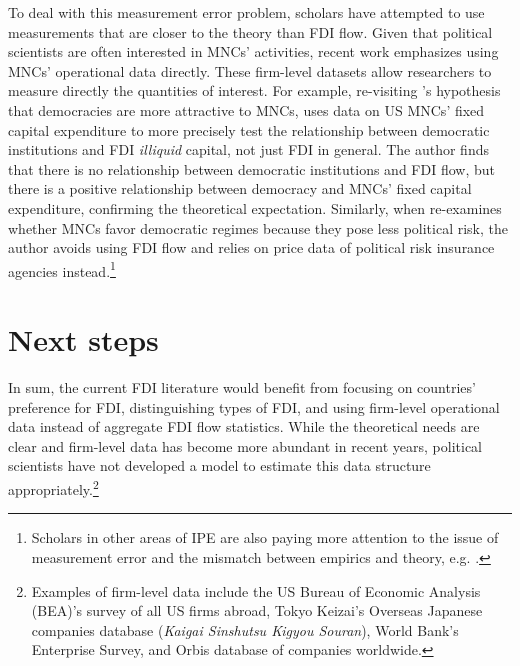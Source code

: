 To deal with this measurement error problem, scholars have attempted to use
measurements that are closer to the theory than FDI flow. Given that political
scientists are often interested in MNCs' activities, recent work emphasizes
using MNCs' operational data directly. These firm-level datasets allow
researchers to measure directly the quantities of interest. For example,
re-visiting \citet{Li2009a}'s hypothesis that democracies are more attractive to
MNCs, \citet{Kerner2014} uses data on US MNCs' fixed capital expenditure to more
precisely test the relationship between democratic institutions and FDI
\textit{illiquid} capital, not just FDI in general. The author finds that there
is no relationship between democratic institutions and FDI flow, but there is a
positive relationship between democracy and MNCs' fixed capital expenditure,
confirming the theoretical expectation. Similarly, when \citet{Jensen2008a}
re-examines whether MNCs favor democratic regimes because they pose less
political risk, the author avoids using FDI flow and relies on price data of
political risk insurance agencies instead.\footnote{Scholars in other areas of
  IPE are also paying more attention to the issue of measurement error and the
  mismatch between empirics and theory, e.g. \citep{Karcher2013}.}


\section{Next steps}

In sum, the current FDI literature would benefit from focusing on countries'
preference for FDI, distinguishing types of FDI, and using firm-level
operational data instead of aggregate FDI flow statistics. While the theoretical
needs are clear and firm-level data has become more abundant in recent years,
political scientists have not developed a model to estimate this data structure
appropriately.\footnote{Examples of firm-level data include the US Bureau of
  Economic Analysis (BEA)'s survey of all US firms abroad, Tokyo Keizai's
  Overseas Japanese companies database (\textit{Kaigai Sinshutsu Kigyou
    Souran}), World Bank's Enterprise Survey, and Orbis database of companies
  worldwide.}

